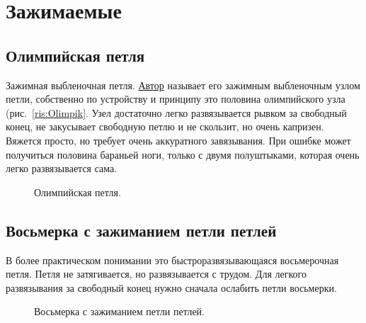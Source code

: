\section{Зажимаемые}

\subsection{Олимпийская петля}

Зажимная выбленочная петля. \href{http://www.earlham.edu/~peters/writing/explode.htm}{Автор} называет его зажимным выбленочным узлом петли, собственно по устройству и принципу это половина олимпийского узла (рис.~\ref{ris:Olimpik}. Узел достаточно легко развязывается рывком за свободный конец, не закусывает свободную петлю и не скользит, но очень капризен. Вяжется просто, но требует очень аккуратного завязывания. При ошибке может получиться половина бараньей ноги, только с двумя полуштыками, которая очень легко развязывается сама.

\begin{figure}[H]\centering
	\subfloat[Завязывание]{\label{ris:Olimpik_loop_1}
	\tcbox[enhanced jigsaw,colframe=black,opacityframe=0.5,opacityback=0.5]
		{\centering
			}
		}
\hfil
	\subfloat[Результат]{\label{ris:Olimpik_loop_2}
	\tcbox[enhanced jigsaw,colframe=black,opacityframe=0.5,opacityback=0.5]
		{\centering
			}
		}
	\caption{Олимпийская петля.}\label{ris:Olimpik_loop}
\end{figure}

\subsection{Восьмерка с зажиманием петли петлей}

В более практическом понимании это быстроразвязывающаяся восьмерочная петля. Петля не затягивается, но развязывается с трудом. Для легкого развязывания за свободный конец нужно сначала ослабить петли восьмерки.

\begin{figure}[H]\centering
	\begin{minipage}{1\linewidth}
		\begin{center}
			\tcbox[enhanced jigsaw,colframe=black,opacityframe=0.5,opacityback=0.5]
			{\centering{}}
		\end{center}
	\end{minipage}
\caption{Восьмерка с зажиманием петли петлей.}
\label{ris:Figure_of_eight_zazhim}
\end{figure}


